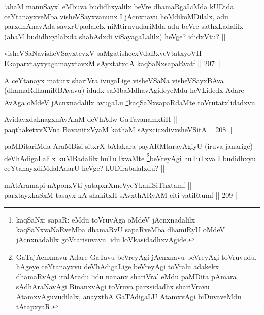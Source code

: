 \begin{artha}
`ahaM manuSayx' eMbuva budidhxyalilx beVre dhamaRgaLiMda kUDida ceYtanayxveMba visheVSayxvanunx I jAcnxnavu hoMdikoMDilalx, adu parxdhAnavAda savxrUpadalelx niMtiruvudariMda adu beVre sathxLadalilx (ahaM budidhxyilalxda shabAdxdi viSayagaLalilx) heVge? ididxVtu? ||
\end{artha}


\begin{shl}
visheVSaNavisheVSayxtevxV saMgatishecxVdaBxveVtatxyoVH || \\
EkaparxtayxyagamayxtavxM sAyxtatxdA kaqSaNxsapaRvatf ||  207 ||  
\end{shl}

\begin{artha}
A ceYtanayx matutx shariVra ivugaLige visheVSaNa visheVSayxBAva (dhamaRdhamiRBAvavu) idudx saMbaMdhavAgideyeMdu heVLidedx Adare AvAga oMdeV jAcnxnadalilx avugaLu \footnote{kaqSaNx: sapaR: eMdu toVruvAga oMdeV jAcnxnadalilx kaqSaNxvaNaRveMba dhamaRvU sapaRveMba dhamiRyU oMdeV jAcnxnadalilx goVcarisuvavu. idu loVkasidadhxvAgide.}kaqSaNxsapaRdaMte toVrutatxlidadxvu. 
\end{artha}

\begin{shl}
AvidavxdaknagxnAvAlaM deVhAdw GaTavanamxtiH || \\
paqthaketxvXVna BavanitxVyaM kathaM sAyxcicxdivxsheVSitA ||  208 ||  
\end{shl} 

\begin{artha}
paMDitariMda AraMBisi sitxrX bAlakara payARMtaravAgiyU (iruva janarige) deVhAdigaLalilx kuMBadalilx huTuTxvaMte \footnote{GaTajAcnxnavu Adare GaTavu beVreyAgi jAcnxnavu beVreyAgi toVruvudu, hAgeye ceYtanayxvu deVhAdigaLige beVreyAgi toVralu adakekx dhamaRvAgi iralAradu `idu nananx shariVra' eMdu paMDita pAmara sAdhAraNavAgi BinanxvAgi toVruva parxsidadhx shariVravu AtamxvAguvudilalx, anayxthA GaTAdigaLU AtamxvAgi biDuvaveMdu tAtapxyaR.}beVreyAgi huTuTxva I budidhxyu ceYtanayxdiMdalAdarU heVge? kUDirabalalxdu? ||
\end{artha}

\begin{shl}
mAtAramapi nA\s \s ponxVti yatapxrXmeVyeYkaniSiThxtamf || \\
parxtayxkaSxM tasayx kA shakitxH sAvxthARyAM citi vatiRtumf ||  209 ||  
\end{shl}

